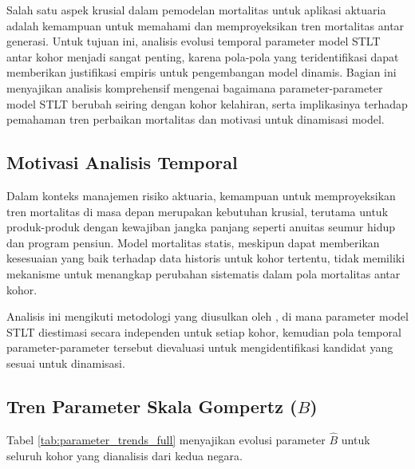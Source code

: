 Salah satu aspek krusial dalam pemodelan mortalitas untuk aplikasi aktuaria adalah kemampuan untuk memahami dan memproyeksikan tren mortalitas antar generasi. Untuk tujuan ini, analisis evolusi temporal parameter model STLT antar kohor menjadi sangat penting, karena pola-pola yang teridentifikasi dapat memberikan justifikasi empiris untuk pengembangan model dinamis. Bagian ini menyajikan analisis komprehensif mengenai bagaimana parameter-parameter model STLT berubah seiring dengan kohor kelahiran, serta implikasinya terhadap pemahaman tren perbaikan mortalitas dan motivasi untuk dinamisasi model.

\subsection{Motivasi Analisis Temporal}

Dalam konteks manajemen risiko aktuaria, kemampuan untuk memproyeksikan tren mortalitas di masa depan merupakan kebutuhan krusial, terutama untuk produk-produk dengan kewajiban jangka panjang seperti anuitas seumur hidup dan program pensiun. Model mortalitas statis, meskipun dapat memberikan kesesuaian yang baik terhadap data historis untuk kohor tertentu, tidak memiliki mekanisme untuk menangkap perubahan sistematis dalam pola mortalitas antar kohor.

Analisis ini mengikuti metodologi yang diusulkan oleh \citet{Huang2020}, di mana parameter model STLT diestimasi secara independen untuk setiap kohor, kemudian pola temporal parameter-parameter tersebut dievaluasi untuk mengidentifikasi kandidat yang sesuai untuk dinamisasi.

\subsection{Tren Parameter Skala Gompertz ($B$)}

Tabel \ref{tab:parameter_trends_full} menyajikan evolusi parameter $\hat{B}$ untuk seluruh kohor yang dianalisis dari kedua negara.

